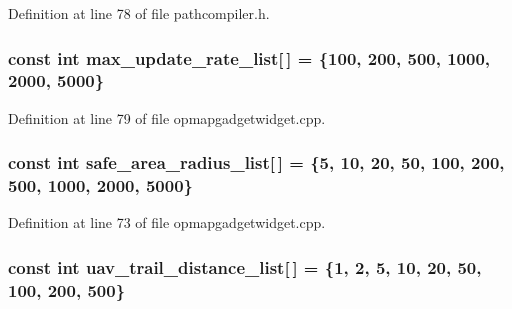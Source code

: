 \-Definition at line 78 of file pathcompiler.\-h.

\hypertarget{group___o_p_map_plugin_ga924197d237c4236b05e045cf5b299e51}{
\subsubsection[{max\-\_\-update\-\_\-rate\-\_\-list}]{\setlength{\rightskip}{0pt plus 5cm}const int {\bf max\-\_\-update\-\_\-rate\-\_\-list}\mbox{[}$\,$\mbox{]} = \{100, 200, 500, 1000, 2000, 5000\}}}\label{group___o_p_map_plugin_ga924197d237c4236b05e045cf5b299e51}


\-Definition at line 79 of file opmapgadgetwidget.\-cpp.

\hypertarget{group___o_p_map_plugin_ga508cdf04246e0731ce2b58e5d72844d6}{
\subsubsection[{safe\-\_\-area\-\_\-radius\-\_\-list}]{\setlength{\rightskip}{0pt plus 5cm}const int {\bf safe\-\_\-area\-\_\-radius\-\_\-list}\mbox{[}$\,$\mbox{]} = \{5, 10, 20, 50, 100, 200, 500, 1000, 2000, 5000\}}}\label{group___o_p_map_plugin_ga508cdf04246e0731ce2b58e5d72844d6}


\-Definition at line 73 of file opmapgadgetwidget.\-cpp.

\hypertarget{group___o_p_map_plugin_ga8974b27951316cb97856a384f680d85e}{
\subsubsection[{uav\-\_\-trail\-\_\-distance\-\_\-list}]{\setlength{\rightskip}{0pt plus 5cm}const int {\bf uav\-\_\-trail\-\_\-distance\-\_\-list}\mbox{[}$\,$\mbox{]} = \{1, 2, 5, 10, 20, 50, 100, 200, 500\}}}\label{group___o_p_map_plugin_ga8974b27951316cb97856a384f680d85e}


